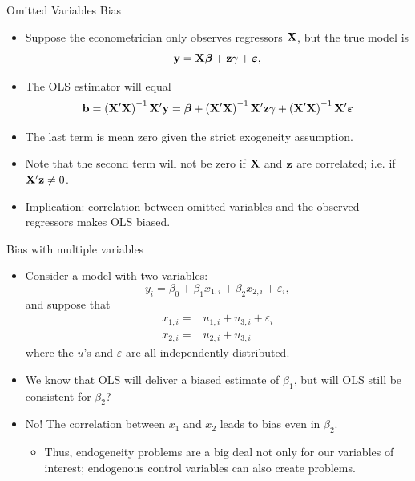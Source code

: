 \documentclass[english,xcolor={dvipsnames},aspectratio=169]{beamer}
\begin{document}
\begin{frame}{Omitted Variables Bias}
\begin{itemize}
	\item Suppose the econometrician only observes regressors ${\bf X} $, but the true model is\[
			{\bf y}= {\bf X} \boldsymbol{\beta} + {\bf z} \gamma + \boldsymbol{\varepsilon},
	\]

	\item The OLS estimator will equal\[
	{\bf b} = \left({\bf X}'{\bf X}\right)^{-1} {\bf X}' {\bf y} = \boldsymbol{\beta}  + \left({\bf X}'{\bf X}\right)^{-1} {\bf X}' {\bf z} \gamma + \left({\bf X}'{\bf X}\right)^{-1} {\bf X}' \boldsymbol{\varepsilon}
	\]

	\item The last term is mean zero given the strict exogeneity assumption.

	\item Note that the second term will not be zero if ${\bf X}$ and ${\bf z}$ are correlated;
	i.e. if $ {\bf X}' {\bf z} \ne 0$.

	\item Implication:  correlation between omitted variables and the observed regressors makes OLS biased.

	
\end{itemize}
\end{frame}







\begin{frame}{Bias with multiple variables}
\begin{itemize}
		\item<1-> Consider a model with two variables:\[
			y_i = \beta_0 + \beta_1 x_{1,i} + \beta_2 x_{2,i} + \varepsilon_i,
		\]
		and suppose that
		\begin{align*}
			x_{1,i} =& u_{1,i} + u_{3,i} + \varepsilon_i  \\
			x_{2,i} =& u_{2,i} + u_{3,i}
		\end{align*}		
		where the $u$'s and $\varepsilon$ are all independently distributed. 
		
		\item<1-> We know that OLS will deliver
		a biased estimate of $\beta_{1}$, but will OLS still be consistent for $\beta_2$?
		
		\medskip
		\item<2-> No! The correlation between $x_1$ and $x_2$ leads to bias even
		in $\beta_2$.
		\begin{itemize}
			\item<2-> Thus, endogeneity problems are a big deal not only for our variables of interest; endogenous
			control variables can also create problems.
		\end{itemize}
\end{itemize}
\end{frame}
\end{document}
